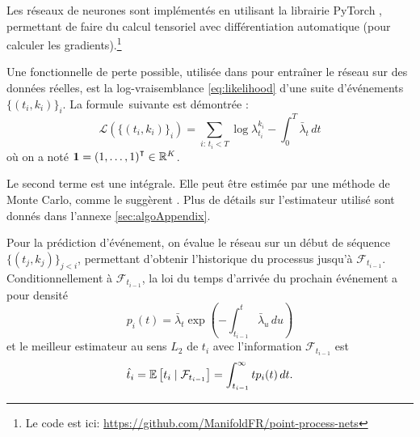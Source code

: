 \documentclass[../main.tex]{subfiles}
\begin{document}
	
Les réseaux de neurones sont implémentés en utilisant la librairie \textsf{PyTorch} \cite{paszke2017automatic}, permettant de faire du calcul tensoriel avec différentiation automatique (pour calculer les gradients).\footnote{Le code est ici: \url{https://github.com/ManifoldFR/point-process-nets}}

Une fonctionnelle de perte possible, utilisée dans \autocite{meiEisnerNeuralHawkes} pour entraîner le réseau sur des données réelles, est la log-vraisemblance \eqref{eq:likelihood} d'une suite d'événements $\{(t_i,k_i)\}_i$. La formule\footnotemark~suivante est démontrée \cite[15]{meiEisnerNeuralHawkes}: 
\begin{equation}\label{eq:explicitLikelihood}
\mathcal{L}\left(\{(t_i,k_i)\}_i\right)
=
\sum_{i:\, t_i < T} \log\lambda^{k_i}_{t_i} - \int_0^T \bar\lambda_t\,dt
\end{equation}
où on a noté $\mathbf{1} = {(1,\ldots,1)}^\intercal\in\mathbb{R}^K$.


Le second terme est une intégrale. Elle peut être estimée par une méthode de Monte Carlo, comme le suggèrent \citeauthor{meiEisnerNeuralHawkes}. Plus de détails sur l'estimateur utilisé sont donnés dans l'annexe \autoref{sec:algoAppendix}.

Pour la prédiction d'événement, on évalue le réseau sur un début de séquence $\{(t_j,k_j)\}_{j < i}$, permettant d'obtenir l'historique du processus jusqu'à $\mathcal{F}_{t_{i-1}}$. Conditionnellement à $\mathcal{F}_{t_{i-1}}$, la loi du temps d'arrivée du prochain événement a pour densité
\[
	p_i(t) = \bar\lambda_t\exp\left(-\int_{t_{i-1}}^t\bar\lambda_u\,du\right)
\]
et le meilleur estimateur au sens $L_2$ de $t_i$ avec l'information $\mathcal{F}_{t_{i-1}}$ est
\[
	\hat{t}_i = \mathbb{E}\left[ t_i \mid \mathcal{F}_{t_{i-1}} \right]
	=
	\int_{t_{i-1}}^\infty t p_i(t)\,dt.
\]
\end{document}

